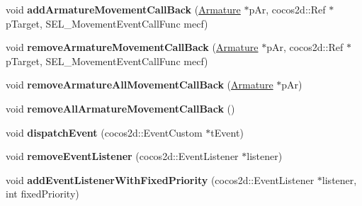 \begin{DoxyCompactItemize}
void {\bfseries add\+Armature\+Movement\+Call\+Back} (\hyperlink{classcocostudio_1_1Armature}{Armature} $\ast$p\+Ar, cocos2d\+::\+Ref $\ast$p\+Target, S\+E\+L\+\_\+\+Movement\+Event\+Call\+Func mecf)
\item 
\mbox{\label{classcocostudio_1_1TriggerMng_ad3287cd4501ea7b11b53f6fd88129218}} 
void {\bfseries remove\+Armature\+Movement\+Call\+Back} (\hyperlink{classcocostudio_1_1Armature}{Armature} $\ast$p\+Ar, cocos2d\+::\+Ref $\ast$p\+Target, S\+E\+L\+\_\+\+Movement\+Event\+Call\+Func mecf)
\item 
\mbox{\label{classcocostudio_1_1TriggerMng_aa17fdff3d21ae78577a5347aaf22c35e}} 
void {\bfseries remove\+Armature\+All\+Movement\+Call\+Back} (\hyperlink{classcocostudio_1_1Armature}{Armature} $\ast$p\+Ar)
\item 
\mbox{\label{classcocostudio_1_1TriggerMng_a012a8aa923f23db224aec14e60cee54a}} 
void {\bfseries remove\+All\+Armature\+Movement\+Call\+Back} ()
\item 
\mbox{\label{classcocostudio_1_1TriggerMng_a06695a400b6aa2ff5353db50e632cad6}} 
void {\bfseries dispatch\+Event} (cocos2d\+::\+Event\+Custom $\ast$t\+Event)
\item 
\mbox{\label{classcocostudio_1_1TriggerMng_ab52f0e7456e133a49d418071c611f20c}} 
void {\bfseries remove\+Event\+Listener} (cocos2d\+::\+Event\+Listener $\ast$listener)
\item 
\mbox{\label{classcocostudio_1_1TriggerMng_a1333f6179748f1c2c98e1b075105f047}} 
void {\bfseries add\+Event\+Listener\+With\+Fixed\+Priority} (cocos2d\+::\+Event\+Listener $\ast$listener, int fixed\+Priority)
\end{DoxyCompactItemize}
